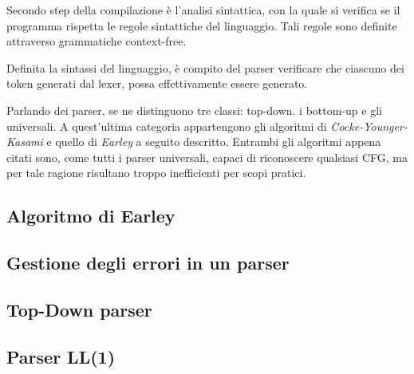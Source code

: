 \documentclass{subfiles}
\begin{document}
Secondo step della compilazione è l'analisi sintattica, con la quale si verifica se il programma rispetta le regole sintattiche del linguaggio.
Tali regole sono definite attraverso grammatiche context-free.

Definita la sintassi del linguaggio, è compito del parser verificare che ciascuno dei token generati dal lexer, possa effettivamente essere generato.

Parlando dei parser, se ne distinguono tre classi: top-down. i bottom-up e gli universali.
A quest'ultima categoria appartengono gli algoritmi di \emph{Cocke-Younger-Kasami} e quello di \emph{Earley} a seguito descritto.
Entrambi gli algoritmi appena citati sono, come tutti i parser universali, capaci di riconoscere qualsiasi CFG,
ma per tale ragione risultano troppo inefficienti per scopi pratici.

\subsection{Algoritmo di Earley}

\clearpage

\subsection{Gestione degli errori in un parser}


\subsection{Top-Down parser}

\clearpage

\subsection{Parser LL(1)}

\clearpage

% 
\end{document}
